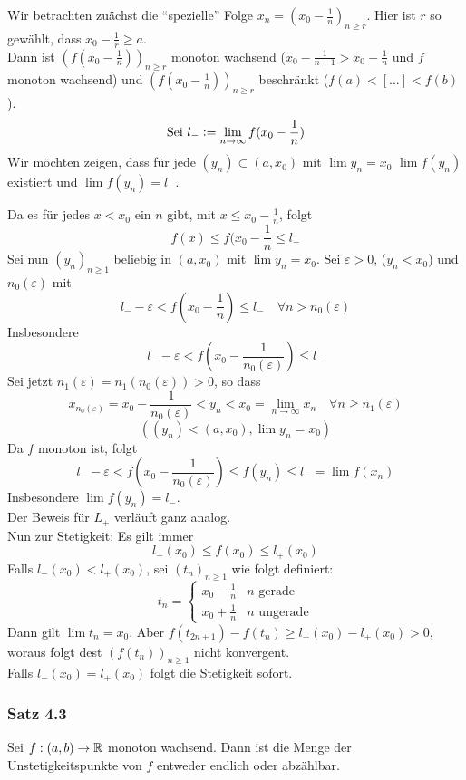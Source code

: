 \noindent Wir betrachten zuächst die ``spezielle'' Folge $x_{n}=(x_{0}-\frac{1}{n})_{n\geq r}$. Hier ist $r$ so gewählt, dass $x_{0}-\frac{1}{r}\geq a$. \\
Dann ist $(f(x_{0}-\frac{1}{n}))_{n\geq r}$ monoton wachsend ($x_{0}-\frac{1}{n+1} > x_{0}-\frac{1}{n}$ und $f$ monoton wachsend) und $(f(x_{0}-\frac{1}{n}))_{n\geq r}$ beschränkt ($f(a)<[...]<f(b)$).
\[\text{Sei }l_{-}\vcentcolon=\lim_{n\to\infty}{f(x_{0}-\frac{1}{n})}\]
\noindent Wir möchten zeigen, dass für jede $(y_{n})\subset (a, x_{0})$ mit $\lim{y_{n}}=x_{0}$ $\lim{f(y_{n})}$ existiert und $\lim{f(y_{n})}=l_{-}$. 

Da es für jedes $x<x_{0}$ ein $n$ gibt, mit $x\leq x_{0}-\frac{1}{n}$, folgt \[f(x) \leq f(x_{0}-\frac{1}{n} \leq l_{-}\]
Sei nun $(y_{n})_{n\geq 1}$ beliebig in $(a, x_{0})$ mit $\lim{y_{n}}=x_{0}$. Sei $\varepsilon > 0$, ($y_{n} < x_{0}$) und $n_{0}(\varepsilon)$ mit \[l_{-}-\varepsilon < f(x_{0}-\frac{1}{n})\leq l_{-} \quad \forall n>n_{0}(\varepsilon) \]
Insbesondere
\[l_{-} - \varepsilon < f(x_{0}-\frac{1}{n_{0}(\varepsilon)}) \leq l_{-} \]
Sei jetzt $n_{1}(\varepsilon)=n_{1}(n_{0}(\varepsilon))>0$, so dass \[ x_{n_{0}(\varepsilon)} = x_{0} - \frac{1}{n_{0}(\varepsilon)} < y_{n} < x_{0} = \lim_{n\to\infty}{x_{n}} \quad \forall n \geq n_{1}(\varepsilon)\]
\[ \left((y_{n})<(a,x_{0}), \lim{y_{n}}=x_{0}\right)\]
Da $f$ monoton ist, folgt \[ l_{-} - \varepsilon < f(x_{0}-\frac{1}{n_{0}(\varepsilon)}) \leq f(y_{n}) \leq l_{-} = \lim{f(x_{n})} \]
Insbesondere $\lim{f(y_{n})} = l_{-}$. \\

\noindent Der Beweis für $L_{+}$ verläuft ganz analog. \\

\noindent Nun zur Stetigkeit: Es gilt immer \[ l_{-}(x_{0})\leq f(x_{0}) \leq l_{+}(x_{0}) \]
Falls $l_{-}(x_{0}) < l_{+}(x_{0})$, sei $(t_{n})_{n \geq 1}$ wie folgt definiert:
\[ t_{n}=\begin{cases}x_{0}-\frac{1}{n} &n\text{ gerade} \\ x_{0}+\frac{1}{n} &n\text{ ungerade} \end{cases} \]
Dann gilt $\lim{t_{n}} = x_{0}$. Aber $f(t_{2n+1})-f(t_{n}) \geq l_{+}(x_{0})-l_{+}(x_{0}) >0$, woraus folgt dest  $(f(t_{n}))_{n\geq1}$ nicht konvergent. \\
Falls $l_{-}(x_{0})=l_{+}(x_{0})$ folgt die Stetigkeit sofort.

\subsubsection*{Satz 4.3}
Sei $f:(a,b)\to\mathbb{R}$ monoton wachsend. Dann ist die Menge der Unstetigkeitspunkte von $f$ entweder endlich oder abzählbar.
